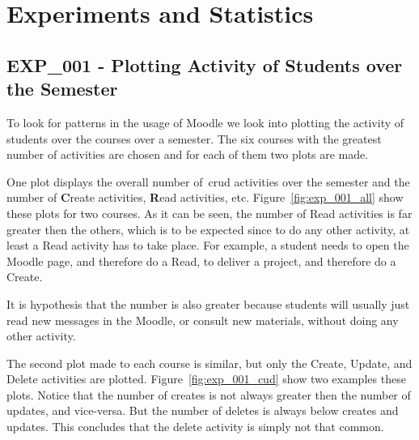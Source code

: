 \chapter{Experiments and Statistics}

\section{EXP\_001 - Plotting Activity of Students over the Semester}

To look for patterns in the usage of Moodle we look into plotting the activity
of students over the courses over a semester. The six courses with the greatest
number of activities are chosen and for each of them two plots are made.

One plot displays the overall number of~\gls{crud} activities over the semester
and the number of \textbf{C}reate activities, \textbf{R}ead activities, etc.
Figure~\ref{fig:exp_001_all} show these plots for two courses. As it can be
seen, the number of Read activities is far greater then the others, which is to
be expected since to do any other activity, at least a Read activity has to
take place. For example, a student needs to open the Moodle page, and therefore
do a Read, to deliver a project, and therefore do a Create.

It is hypothesis that the number is also greater because students will usually
just read new messages in the Moodle, or consult new materials, without doing
any other activity.

The second plot made to each course is similar, but only the Create, Update,
and Delete activities are plotted. Figure~\ref{fig:exp_001_cud} show two
examples these plots. Notice that the number of creates is not always greater
then the number of updates, and vice-versa. But the number of deletes is always
below creates and updates. This concludes that the delete activity is simply
not that common.

